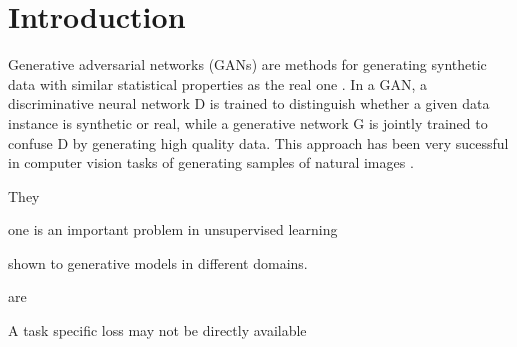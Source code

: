 \section{Introduction}

Generative adversarial networks (GANs) are methods for generating synthetic
data with similar statistical properties as the real one
\cite{goodfellow2014generative}. In a GAN, a discriminative neural network D is
trained to distinguish whether a given data instance is synthetic or real, while a
generative network G is jointly trained to confuse D by generating high quality
data. This approach has been very sucessful in computer vision tasks of
generating samples of natural images \cite{denton2015deep,dosovitskiy2016generating,radford2016}.

They


one is an important problem in unsupervised learning

shown to  generative models
in different domains.

are 

A task specific loss may not be directly
available

